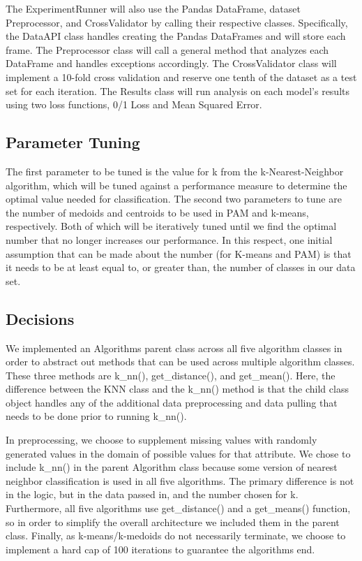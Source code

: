 \documentclass[twoside,11pt]{article}
\begin{document}
    The ExperimentRunner will also use the Pandas DataFrame, dataset Preprocessor, and CrossValidator by calling their respective classes. Specifically, the DataAPI class handles creating the Pandas DataFrames and will store each frame. The Preprocessor class will call a general method that analyzes each DataFrame and handles exceptions accordingly. The CrossValidator class will implement a 10-fold cross validation and reserve one tenth of the dataset as a test set for each iteration. The Results class will run analysis on each model's results using two loss functions, 0/1 Loss and Mean Squared Error. 
    
    \subsection{Parameter Tuning}
    The first parameter to be tuned is the value for k from the k-Nearest-Neighbor algorithm, which will be tuned against a performance measure to determine the optimal value needed for classification. The second two parameters to tune are the number of medoids and centroids to be used in PAM and k-means, respectively. Both of which will be iteratively tuned until we find the optimal number that no longer increases our performance. In this respect, one initial assumption that can be made about the number (for K-means and PAM) is that it needs to be at least equal to, or greater than, the number of classes in our data set.
    
    \subsection{Decisions}
    We implemented an Algorithms parent class across all five algorithm classes in order to abstract out methods that can be used across multiple algorithm classes. These three methods are k\_nn(), get\_distance(), and get\_mean(). Here, the difference between the KNN class and the k\_nn() method is that the child class object handles any of the additional data preprocessing and data pulling that needs to be done prior to running k\_nn(). 
    
    In preprocessing, we choose to supplement missing values with randomly generated values in the domain of possible values for that attribute. We chose to include k\_nn() in the parent Algorithm class because some version of nearest neighbor classification is used in all five algorithms. The primary difference is not in the logic, but in the data passed in, and the number chosen for k. Furthermore, all five algorithms use get\_distance() and a get\_means() function, so in order to simplify the overall architecture we included them in the parent class. Finally, as k-means/k-medoids do not necessarily terminate, we choose to implement a hard cap of 100 iterations to guarantee the algorithms end.
    
\end{document}
